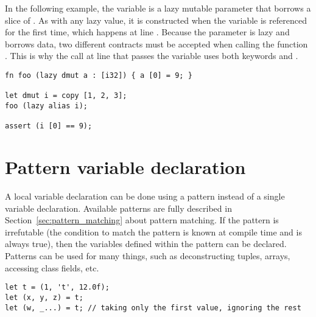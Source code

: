 In the following example, the variable  is a lazy mutable parameter
that borrows a slice of . As with any lazy value, it is constructed
when the variable  is referenced for the first time, which happens at
line . Because the parameter  is lazy and borrows data, two
different contracts must be accepted when calling the function . This
is why the call at line  that passes the variable  uses both
keywords  and .

\begin{lstlisting}[style=coloredverbatim, caption=Example of lazy mutable parameter]
fn foo (lazy dmut a : [i32]) { a [0] = 9; }

let dmut i = copy [1, 2, 3];
foo (lazy alias i);

assert (i [0] == 9);
\end{lstlisting}


\vfill%
\pagebreak

\section{Pattern variable declaration}
\label{sec:pattern_vdecl}

A local variable declaration can be done using a pattern instead of a single
variable declaration. Available patterns are fully described in
Section~\ref{sec:pattern_matching} about pattern matching. If the pattern is
irrefutable (the condition to match the pattern is known at compile time and is
always true), then the variables defined within the pattern can be declared.
Patterns can be used for many things, such as deconstructing tuples, arrays,
accessing class fields, etc.

\begin{lstlisting}[style=coloredverbatim, escapechar=@, caption=Tuple deconstruction]
let t = (1, 't', 12.0f);
let (x, y, z) = t;
let (w, _...) = t; // taking only the first value, ignoring the rest
\end{lstlisting}

